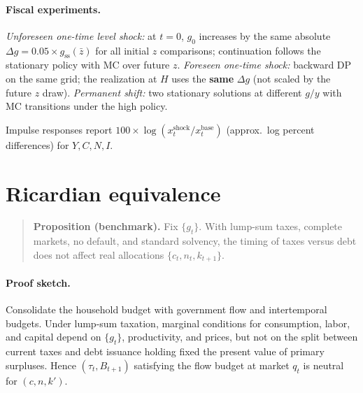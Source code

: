 \documentclass[11pt,a4paper]{article}
\begin{document}
\paragraph{Fiscal experiments.}
\textit{Unforeseen one-time level shock:} at $t=0$, $g_0$ increases by the same absolute $\Delta g = 0.05\times g_{\mathrm{ss}}(\bar z)$ for all initial $z$ comparisons; continuation follows the stationary policy with MC over future $z$. \textit{Foreseen one-time shock:} backward DP on the same grid; the realization at $H$ uses the \textbf{same} $\Delta g$ (not scaled by the future $z$ draw). \textit{Permanent shift:} two stationary solutions at different $g/y$ with MC transitions under the high policy.

Impulse responses report $100\times\log(x^{\text{shock}}_t/x^{\text{base}}_t)$ (approx.\ log percent differences) for $Y,C,N,I$.

\section{Ricardian equivalence}
\label{sec:ricardian}

\begin{quote}
\textbf{Proposition (benchmark).}
Fix $\{g_t\}$. With lump-sum taxes, complete markets, no default, and standard solvency, the timing of taxes versus debt does not affect real allocations $\{c_t,n_t,k_{t+1}\}$.
\end{quote}

\paragraph{Proof sketch.}
Consolidate the household budget with government flow and intertemporal budgets. Under lump-sum taxation, marginal conditions for consumption, labor, and capital depend on $\{g_t\}$, productivity, and prices, but not on the split between current taxes and debt issuance holding fixed the present value of primary surpluses. Hence $(\tau_t,B_{t+1})$ satisfying the flow budget at market $q_t$ is neutral for $(c,n,k')$.
\end{document}
